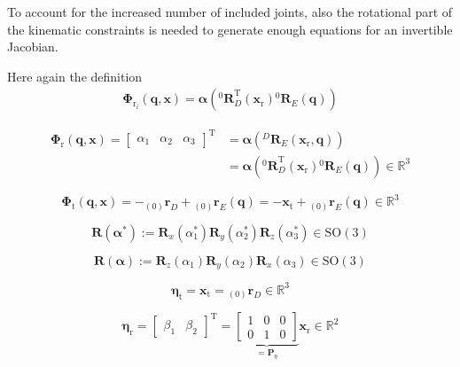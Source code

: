 \documentclass[robotics,article,submit,moreauthors,pdftex]{Definitions/mdpi}
\newcommand{\bm}[1]{\boldsymbol{#1}}
\newcommand{\ortvek}[4]{{ }_{(#1)}{\boldsymbol{#2}}^{#3}_{#4} }
\newcommand{\rotmat}[2]{{{ }^{#1}\boldsymbol{R}}_{#2}}
\newcommand{\transp}[0]{{\mathrm{T}}}
\begin{document}
To account for the increased number of included joints, also the rotational part of the kinematic constraints is needed to generate enough equations for an invertible Jacobian.

Here again the definition 
%
\begin{align}
\bm{\Phi}_{\mathrm{r}_i}(\bm{q},\bm{x})
=\bm{\alpha}\left(\rotmat{0}{D}^\transp (\bm{x}_{\mathrm{r}})\rotmat{0}{E}(\bm{q})\right)
\end{align}

\begin{align}
\bm{\Phi}_{\mathrm{r}}(\bm{q},\bm{x}) 
= \begin{bmatrix}
\alpha_1  & \alpha_2 & \alpha_3
\end{bmatrix}^\transp
&=\bm{\alpha}\left(\rotmat{D}{E}(\bm{x}_{\mathrm{r}},\bm{q})\right)\nonumber \\
&=\bm{\alpha}\left(\rotmat{0}{D}^\transp (\bm{x}_{\mathrm{r}})\rotmat{0}{E}(\bm{q})\right) \in {\mathbb{R}}^{3}
\label{equ:Phir_def}
\end{align}


\begin{equation}
\bm{\Phi}_{\mathrm{t}}(\bm{q},\bm{x})
=
- \ortvek{0}{r}{}{D} + \ortvek{0}{r}{}{E}(\bm{q})
=
- \bm{x}_{\mathrm{t}} + \ortvek{0}{r}{}{E}(\bm{q})
\in {\mathbb{R}}^{3}
\label{equ:Phit_def}
\end{equation}

\begin{equation}
\bm{R}(\bm{\alpha}^*) := \bm{R}_x(\alpha_1^*) \bm{R}_y(\alpha_2^*) \bm{R}_z(\alpha_3^*) \in \mathrm{SO(3)}
\label{equ:alpha_convention_xyz}
\end{equation}

\begin{equation}
\bm{R}(\bm{\alpha}) := \bm{R}_z(\alpha_1) \bm{R}_y(\alpha_2) \bm{R}_x(\alpha_3) \in \mathrm{SO(3)}
\label{equ:def_rmat_zyxr}
\end{equation}


\begin{equation}
\bm{\eta}_{\mathrm{t}}
=
\bm{x}_{\mathrm{t}}
=
\ortvek{0}{r}{}{D}
\in {\mathbb{R}}^{3}
\end{equation}  


\begin{equation}
\bm{\eta}_{\mathrm{r}}
=
\begin{bmatrix}
\beta_1  & \beta_2
\end{bmatrix}^\transp
=
\underbrace{\begin{bmatrix}
    1 & 0 & 0  \\ 
    0 & 1 & 0
    \end{bmatrix}}_{=\bm{P}_{\eta}}
\bm{x}_{\mathrm{r}}
\in {\mathbb{R}}^{2}
\label{equ:etar_def}
\end{equation}
\end{document}
